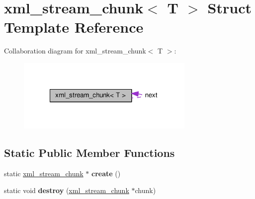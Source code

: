 \hypertarget{structxml__stream__chunk}{\section{xml\+\_\+stream\+\_\+chunk$<$ T $>$ Struct Template Reference}
\label{structxml__stream__chunk}
}


Collaboration diagram for xml\+\_\+stream\+\_\+chunk$<$ T $>$\+:
\nopagebreak
\begin{figure}[H]
\begin{center}
\leavevmode
\includegraphics[width=242pt]{structxml__stream__chunk__coll__graph}
\end{center}
\end{figure}
\subsection*{Static Public Member Functions}
\begin{DoxyCompactItemize}
\item 
\hypertarget{structxml__stream__chunk_a92cffe33c529ff266329fd4afb59226d}{static \hyperlink{structxml__stream__chunk}{xml\+\_\+stream\+\_\+chunk} $\ast$ {\bfseries create} ()}\label{structxml__stream__chunk_a92cffe33c529ff266329fd4afb59226d}

\item 
\hypertarget{structxml__stream__chunk_a3e9bf7280c96a7433d60af129873a16f}{static void {\bfseries destroy} (\hyperlink{structxml__stream__chunk}{xml\+\_\+stream\+\_\+chunk} $\ast$chunk)}\label{structxml__stream__chunk_a3e9bf7280c96a7433d60af129873a16f}

\end{DoxyCompactItemize}
